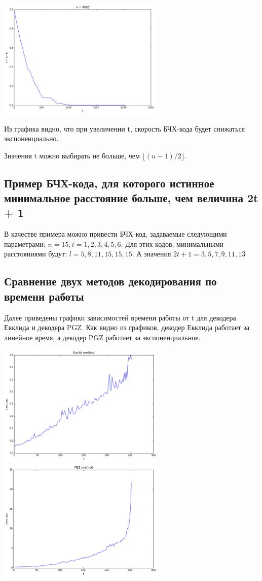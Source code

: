 \documentclass[12pt, a4paper]{article}
\begin{document}
\begin{center}
				\includegraphics[width=7.9cm]{n4095.png}
			\end{center}

			Из графика видно, что при увеличении t, скорость БЧХ-кода будет снижаться экспоненциально.

			Значения t можно выбирать не больше, чем $\lfloor (n - 1) / 2 \rfloor $.

		\subsection{Пример БЧХ-кода, для которого истинное минимальное расстояние больше, чем величина 2t + 1}
			В качестве примера можно привести БЧХ-код, задаваемые следующими параметрами: $n = 15, t = 1, 2, 3, 4, 5, 6$. Для этих кодов, минимальными расстояниями будут: $l = 5, 8, 11, 15, 15, 15$. А значения $2t + 1 = 3, 5, 7, 9, 11, 13$


		\subsection{Сравнение двух методов декодирования по времени работы}
			Далее приведены графики зависимостей времени работы от t для декодера Евклида и декодера PGZ. Как видно из графиков, декодер Евклида работает за линейное время, а декодер PGZ работает за экспоненциальное.
			\begin{center}
				\includegraphics[width=8cm]{euclid.png}
				\includegraphics[width=8cm]{pgz.png}
			\end{center}
\end{document}
